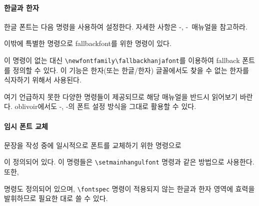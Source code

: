 \documentclass[
	12pt,
	a4paper,
	kosection,
	footnote,
	nobookmarks,
	microtype,
]{oblivoir}
\def\cs#1{\texttt{\textbackslash #1}}
\def\xetexko{\XeTeX-\ko}
\def\luatexko{\LuaTeX-\ko}
\begin{document}
\paragraph{한글과 한자}
한글 폰트는 다음 명령을 사용하여 설정한다. 자세한 사항은 \xetexko, \luatexko\ 매뉴얼을 참고하라.
\begin{boxedverbatim}
\end{boxedverbatim}

이밖에 특별한 명령으로  fallbackfont를 위한 명령이 있다.
\begin{boxedverbatim}
\setmainfallbackfont
\setsansfallbackfont
\setmonofallbackfont
\end{boxedverbatim}
 이 명령이 없는 대신 \cs{newfontfamily}\cs{fallbackhanjafont}를 이용하여
fallback 폰트를 정의할 수 있다. 이 기능은 한자(또는 한글/한자) 글꼴에서도 찾을 수 없는 한자를
식자하기 위해서 사용된다.

여기 언급하지 못한 다양한 명령들이 제공되므로 해당 매뉴얼을 반드시 읽어보기 바란다.
oblivoir에서도 \xetexko, \luatexko 의 폰트 설정 방식을 그대로 활용할 수 있다.

%

\paragraph{임시 폰트 교체}
문장을 작성 중에 일시적으로 폰트를 교체하기 위한 명령으로 
\begin{boxedverbatim}
\adhochangulfont
\adhochanjafont
\end{boxedverbatim}
이 정의되어 있다. 이 명령들은 \verb|\setmainhangulfont| 명령과 같은 방법으로 사용한다. 또한, 
\begin{boxedverbatim}
\hangulfontspec
\hanjafontspec
\end{boxedverbatim}
명령도 정의되어 있으며, \verb|\fontspec| 명령이 적용되지 않는 한글과 한자 영역에 효력을 발휘하므로 필요한 대로 쓸 수 있다.
\end{document}
